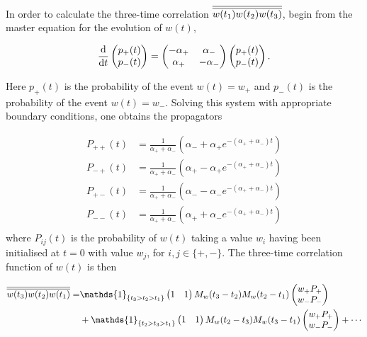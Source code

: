 In order to calculate the three-time correlation $\overline{\overline{w(t_1)w(t_2)w(t_3)}}$, begin from the master equation for the evolution of $w(t)$, 

\begin{equation}
\frac{\mathrm{d}}{\mathrm{d} t}\begin{pmatrix}
p_+(t) \\
p_-(t)
\end{pmatrix} =
\begin{pmatrix}
-\alpha_+ & \alpha_- \\
\alpha_+  & -\alpha_-
\end{pmatrix}
\begin{pmatrix}
p_+(t) \\
p_-(t)
\end{pmatrix}.
\end{equation}

Here $p_+(t)$ is the probability of the event $w(t) = w_+$ and $p_-(t)$ is the probability of the event $w(t) = w_-$. Solving this system with appropriate boundary conditions, one obtains the propagators  

\begin{equation}\label{elements}
    \begin{split}
        P_{++}(t) &= \frac{1}{\alpha_+ + \alpha_-} \left(\alpha_- + \alpha_+ e^{-(\alpha_+ + \alpha_-)t}\right) \\
        P_{-+}(t) &= \frac{1}{\alpha_+ + \alpha_-} \left(\alpha_+ - \alpha_+ e^{-(\alpha_+ + \alpha_-)t}\right) \\
        P_{+-}(t) &= \frac{1}{\alpha_+ + \alpha_-} \left(\alpha_- - \alpha_- e^{-(\alpha_+ + \alpha_-)t}\right) \\
        P_{--}(t) &= \frac{1}{\alpha_+ + \alpha_-} \left(\alpha_+ + \alpha_- e^{-(\alpha_+ + \alpha_-)t}\right) \\
    \end{split}
\end{equation}
where $P_{ij}(t)$ is the probability of $w(t)$ taking a value $w_i$ having been initialised at $t=0$ with value $w_j$, for $i,j \in \{+ , -\}$. The three-time correlation function of $w(t)$ is then 

\begin{equation}\label{3time}
\begin{split}
    \Overline{w(t_3)w(t_2)w(t_1)} =& \mathds{1}_{\{t_3>t_2>t_1\}}
 \begin{pmatrix}
1 & 1\\
\end{pmatrix}
M_{w}(t_3-t_{2})M_{w}(t_2-t_{1})
\begin{pmatrix}
w_+P_{+}\\
w_-P_{-}
\end{pmatrix}\\
&+\mathds{1}_{\{t_2>t_3>t_1\}}
 \begin{pmatrix}
1 & 1\\
\end{pmatrix}
M_{w}(t_2-t_{3})M_{w}(t_3-t_{1})
\begin{pmatrix}
w_+P_{+}\\
w_-P_{-}
\end{pmatrix} + \cdots
\end{split}
\end{equation}

